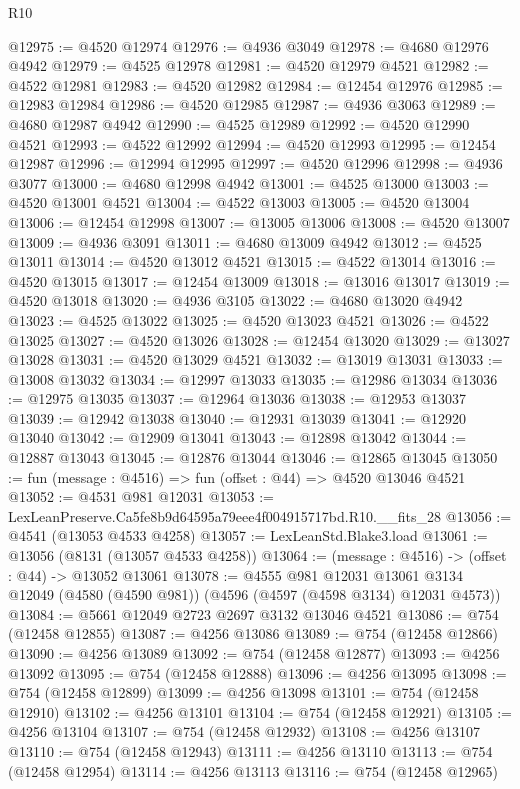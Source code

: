 \begin{lexlean}{R10}
\begin{coremodule}
@12975 := @4520 @12974
@12976 := @4936 @3049
@12978 := @4680 @12976 @4942
@12979 := @4525 @12978
@12981 := @4520 @12979 @4521
@12982 := @4522 @12981
@12983 := @4520 @12982
@12984 := @12454 @12976
@12985 := @12983 @12984
@12986 := @4520 @12985
@12987 := @4936 @3063
@12989 := @4680 @12987 @4942
@12990 := @4525 @12989
@12992 := @4520 @12990 @4521
@12993 := @4522 @12992
@12994 := @4520 @12993
@12995 := @12454 @12987
@12996 := @12994 @12995
@12997 := @4520 @12996
@12998 := @4936 @3077
@13000 := @4680 @12998 @4942
@13001 := @4525 @13000
@13003 := @4520 @13001 @4521
@13004 := @4522 @13003
@13005 := @4520 @13004
@13006 := @12454 @12998
@13007 := @13005 @13006
@13008 := @4520 @13007
@13009 := @4936 @3091
@13011 := @4680 @13009 @4942
@13012 := @4525 @13011
@13014 := @4520 @13012 @4521
@13015 := @4522 @13014
@13016 := @4520 @13015
@13017 := @12454 @13009
@13018 := @13016 @13017
@13019 := @4520 @13018
@13020 := @4936 @3105
@13022 := @4680 @13020 @4942
@13023 := @4525 @13022
@13025 := @4520 @13023 @4521
@13026 := @4522 @13025
@13027 := @4520 @13026
@13028 := @12454 @13020
@13029 := @13027 @13028
@13031 := @4520 @13029 @4521
@13032 := @13019 @13031
@13033 := @13008 @13032
@13034 := @12997 @13033
@13035 := @12986 @13034
@13036 := @12975 @13035
@13037 := @12964 @13036
@13038 := @12953 @13037
@13039 := @12942 @13038
@13040 := @12931 @13039
@13041 := @12920 @13040
@13042 := @12909 @13041
@13043 := @12898 @13042
@13044 := @12887 @13043
@13045 := @12876 @13044
@13046 := @12865 @13045
@13050 := fun (message : @4516) => fun (offset : @44) => @4520 @13046 @4521
@13052 := @4531 @981 @12031
@13053 := LexLeanPreserve.Ca5fe8b9d64595a79eee4f004915717bd.R10.__fits_28
@13056 := @4541 (@13053 @4533 @4258)
@13057 := LexLeanStd.Blake3.load
@13061 := @13056 (@8131 (@13057 @4533 @4258))
@13064 := (message : @4516) -> (offset : @44) -> @13052 @13061
@13078 := @4555
    @981
    @12031
    @13061
    @3134
    @12049
    (@4580 (@4590 @981))
    (@4596 (@4597 (@4598 @3134) @12031 @4573))
@13084 := @5661 @12049 @2723 @2697 @3132 @13046 @4521
@13086 := @754 (@12458 @12855)
@13087 := @4256 @13086
@13089 := @754 (@12458 @12866)
@13090 := @4256 @13089
@13092 := @754 (@12458 @12877)
@13093 := @4256 @13092
@13095 := @754 (@12458 @12888)
@13096 := @4256 @13095
@13098 := @754 (@12458 @12899)
@13099 := @4256 @13098
@13101 := @754 (@12458 @12910)
@13102 := @4256 @13101
@13104 := @754 (@12458 @12921)
@13105 := @4256 @13104
@13107 := @754 (@12458 @12932)
@13108 := @4256 @13107
@13110 := @754 (@12458 @12943)
@13111 := @4256 @13110
@13113 := @754 (@12458 @12954)
@13114 := @4256 @13113
@13116 := @754 (@12458 @12965)

\end{coremodule}
\end{lexlean}
